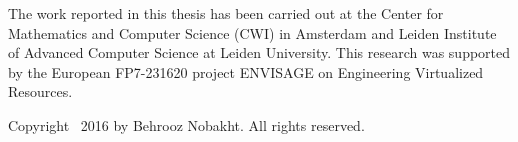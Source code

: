 \begin{titlepage}
%
\noindent
The work reported in this thesis has been carried out at the Center for Mathematics and Computer Science (CWI) in Amsterdam and Leiden Institute of Advanced Computer Science at Leiden University.
This research was supported by the European FP7-231620 project ENVISAGE on Engineering Virtualized Resources.
\par\vspace {1cm}

%

%
\noindent%
Copyright \textcopyright\ 2016 by Behrooz Nobakht. All rights reserved. \\ [2ex] %



	\thesisDate \\

\end{titlepage}


